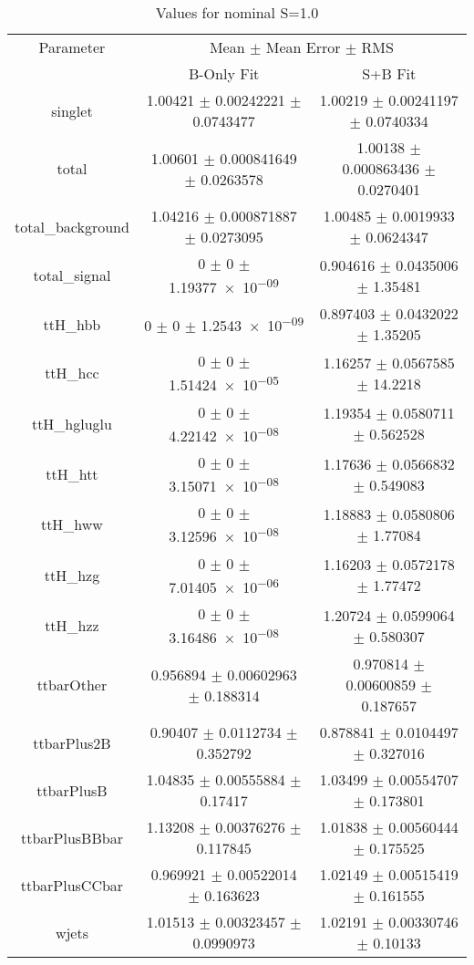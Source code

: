 \begin{table}
\centering
\caption{Values for nominal S=1.0}
\begin{tabular}{ccc}
\toprule
Parameter & \multicolumn{2}{c}{Mean $\pm$ Mean Error $\pm$ RMS}\\
 & B-Only Fit & S+B Fit\\
\midrule
singlet & \num{1.00421} $\pm$ \num{0.00242221} $\pm$ \num{0.0743477} & \num{1.00219} $\pm$ \num{0.00241197} $\pm$ \num{0.0740334}\\
total & \num{1.00601} $\pm$ \num{0.000841649} $\pm$ \num{0.0263578} & \num{1.00138} $\pm$ \num{0.000863436} $\pm$ \num{0.0270401}\\
total\_background & \num{1.04216} $\pm$ \num{0.000871887} $\pm$ \num{0.0273095} & \num{1.00485} $\pm$ \num{0.0019933} $\pm$ \num{0.0624347}\\
total\_signal & \num{0} $\pm$ \num{0} $\pm$ \num{1.19377e-09} & \num{0.904616} $\pm$ \num{0.0435006} $\pm$ \num{1.35481}\\
ttH\_hbb & \num{0} $\pm$ \num{0} $\pm$ \num{1.2543e-09} & \num{0.897403} $\pm$ \num{0.0432022} $\pm$ \num{1.35205}\\
ttH\_hcc & \num{0} $\pm$ \num{0} $\pm$ \num{1.51424e-05} & \num{1.16257} $\pm$ \num{0.0567585} $\pm$ \num{14.2218}\\
ttH\_hgluglu & \num{0} $\pm$ \num{0} $\pm$ \num{4.22142e-08} & \num{1.19354} $\pm$ \num{0.0580711} $\pm$ \num{0.562528}\\
ttH\_htt & \num{0} $\pm$ \num{0} $\pm$ \num{3.15071e-08} & \num{1.17636} $\pm$ \num{0.0566832} $\pm$ \num{0.549083}\\
ttH\_hww & \num{0} $\pm$ \num{0} $\pm$ \num{3.12596e-08} & \num{1.18883} $\pm$ \num{0.0580806} $\pm$ \num{1.77084}\\
ttH\_hzg & \num{0} $\pm$ \num{0} $\pm$ \num{7.01405e-06} & \num{1.16203} $\pm$ \num{0.0572178} $\pm$ \num{1.77472}\\
ttH\_hzz & \num{0} $\pm$ \num{0} $\pm$ \num{3.16486e-08} & \num{1.20724} $\pm$ \num{0.0599064} $\pm$ \num{0.580307}\\
ttbarOther & \num{0.956894} $\pm$ \num{0.00602963} $\pm$ \num{0.188314} & \num{0.970814} $\pm$ \num{0.00600859} $\pm$ \num{0.187657}\\
ttbarPlus2B & \num{0.90407} $\pm$ \num{0.0112734} $\pm$ \num{0.352792} & \num{0.878841} $\pm$ \num{0.0104497} $\pm$ \num{0.327016}\\
ttbarPlusB & \num{1.04835} $\pm$ \num{0.00555884} $\pm$ \num{0.17417} & \num{1.03499} $\pm$ \num{0.00554707} $\pm$ \num{0.173801}\\
ttbarPlusBBbar & \num{1.13208} $\pm$ \num{0.00376276} $\pm$ \num{0.117845} & \num{1.01838} $\pm$ \num{0.00560444} $\pm$ \num{0.175525}\\
ttbarPlusCCbar & \num{0.969921} $\pm$ \num{0.00522014} $\pm$ \num{0.163623} & \num{1.02149} $\pm$ \num{0.00515419} $\pm$ \num{0.161555}\\
wjets & \num{1.01513} $\pm$ \num{0.00323457} $\pm$ \num{0.0990973} & \num{1.02191} $\pm$ \num{0.00330746} $\pm$ \num{0.10133}\\
\bottomrule
\end{tabular}
\end{table}